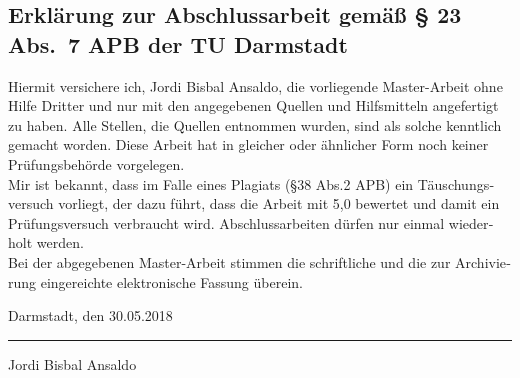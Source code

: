 \documentclass[longdoc,accentcolor=tud1b,11pt,paper=a4]{tudreport}
\title{\komTitle}
\subtitle{\komThesisType}
\newcommand{\komThesisType}{Master-Arbeit\xspace} %
\newcommand{\komName}{Jordi Bisbal Ansaldo\xspace}
\newcommand{\komSubmissionDate}{30.05.2018\xspace}%
\begin{document}
	
	\frenchspacing
	\raggedbottom
	\maketitle
	
    
    \begin{otherlanguage}{ngerman}
    
    \chapter*{Erklärung zur Abschlussarbeit gemäß § 23 Abs.\ 7 APB der TU Darmstadt}
    Hiermit versichere ich, \komName, die vorliegende \komThesisType ohne Hilfe Dritter und nur mit den angegebenen Quellen und Hilfsmitteln angefertigt zu haben. 
    Alle Stellen, die Quellen entnommen wurden, sind als solche kenntlich gemacht worden. 
    Diese Arbeit hat in gleicher oder ähnlicher Form noch keiner Prüfungsbehörde vorgelegen.\\

    \noindent Mir ist bekannt, dass im Falle eines Plagiats (§38 Abs.2 APB) ein Täuschungsversuch vorliegt, der dazu führt, dass die Arbeit mit 5,0 bewertet und damit ein Prüfungsversuch verbraucht wird. 
    Abschlussarbeiten dürfen nur einmal wiederholt werden.\\

    \noindent Bei der abgegebenen \komThesisType stimmen die schriftliche und die zur Archivierung eingereichte elektronische Fassung überein. 
    
    \vspace{4em}
    
    \noindent Darmstadt, den \komSubmissionDate 
    
    \vspace{3em}
    
    \noindent\rule{5cm}{0.4pt}
    
    \noindent\komName
    
    \end{otherlanguage}
\end{document}
